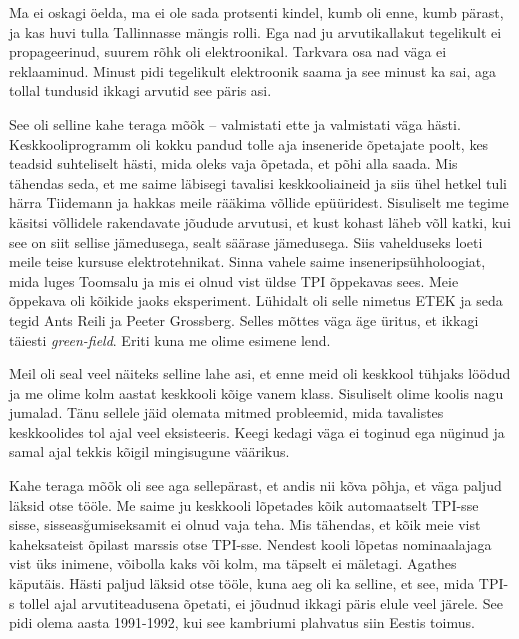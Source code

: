 
Ma ei oskagi öelda, ma ei ole sada protsenti kindel, kumb oli enne, kumb 
pärast, ja kas huvi tulla Tallinnasse mängis rolli. Ega nad ju 
arvutikallakut tegelikult ei propageerinud, suurem rõhk oli elektroonikal. 
Tarkvara osa nad väga ei reklaaminud. Minust pidi tegelikult elektroonik saama 
ja see minust ka sai, aga tollal tundusid ikkagi arvutid 
see päris asi. 


See oli selline kahe teraga mõõk – valmistati ette ja 
valmistati väga hästi. Keskkooliprogramm oli kokku pandud 
tolle aja inseneride õpetajate poolt, kes teadsid suhteliselt hästi, mida oleks 
vaja õpetada, et põhi alla saada. Mis tähendas seda, et me saime 
läbisegi tavalisi keskkooliaineid ja siis ühel hetkel tuli härra 
Tiidemann ja hakkas meile rääkima võllide 
epüüridest. Sisuliselt me tegime käsitsi võllidele 
rakendavate jõudude arvutusi, et kust kohast läheb võll katki, kui see on siit
sellise jämedusega, sealt säärase jämedusega. Siis vahelduseks loeti meile 
teise kursuse elektrotehnikat. Sinna vahele saime 
inseneripsühholoogiat, mida luges Toomsalu ja mis ei 
olnud vist üldse TPI õppekavas sees. Meie õppekava oli kõikide jaoks 
eksperiment. Lühidalt oli selle nimetus ETEK ja seda tegid Ants 
Reili ja 
Peeter Grossberg. Selles mõttes 
väga äge üritus, et ikkagi täiesti \emph{green-field}. Eriti kuna me 
olime esimene lend. 

Meil oli seal veel näiteks selline lahe asi, et 
enne meid oli keskkool tühjaks löödud ja me olime kolm aastat keskkooli kõige 
vanem klass. Sisuliselt olime koolis nagu jumalad. 
Tänu sellele jäid olemata mitmed probleemid, mida tavalistes 
keskkoolides tol ajal veel eksisteeris. Keegi kedagi väga ei toginud ega 
nüginud ja samal ajal tekkis kõigil mingisugune väärikus. 

Kahe teraga mõõk oli see aga sellepärast, et andis nii kõva põhja, et väga 
paljud 
läksid otse tööle. Me saime ju keskkooli lõpetades kõik  
automaatselt TPI-sse sisse, sisseasğumiseksamit ei olnud vaja teha. Mis 
tähendas, et kõik meie vist kaheksateist õpilast marssis otse TPI-sse. Nendest 
kooli lõpetas nominaalajaga vist üks inimene, võibolla kaks või kolm, ma 
täpselt 
ei mäletagi. Agathes käputäis. Hästi paljud läksid otse tööle, kuna aeg oli ka 
selline, et see, mida TPI-s tollel ajal arvutiteadusena õpetati, ei jõudnud 
ikkagi päris elule veel järele. See pidi olema aasta 1991-1992, kui 
see kambriumi plahvatus siin Eestis toimus.

